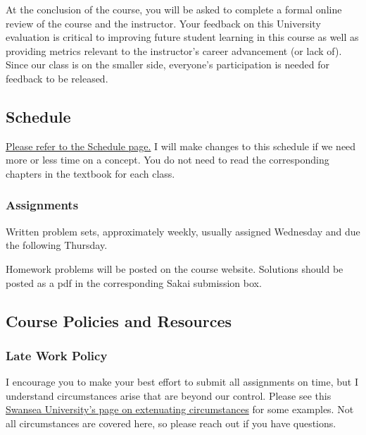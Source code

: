 \documentclass[
  letterpaper,
  DIV=11,
  numbers=noendperiod]{scrartcl}
\begin{document}
At the conclusion of the course, you will be asked to complete a formal
online review of the course and the instructor. Your feedback on this
University evaluation is critical to improving future student learning
in this course as well as providing metrics relevant to the instructor's
career advancement (or lack of). Since our class is on the smaller side,
everyone's participation is needed for feedback to be released.

\subsection{Schedule}\label{schedule}

\href{./schedule.qmd}{Please refer to the Schedule page.} I will make
changes to this schedule if we need more or less time on a concept. You
do not need to read the corresponding chapters in the textbook for each
class.

\subsubsection{Assignments}\label{assignments}

Written problem sets, approximately weekly, usually assigned Wednesday
and due the following Thursday.

Homework problems will be posted on the course website. Solutions should
be posted as a pdf in the corresponding Sakai submission box.

\subsection{Course Policies and
Resources}\label{course-policies-and-resources}

\subsubsection{Late Work Policy}\label{late-work-policy}

I encourage you to make your best effort to submit all assignments on
time, but I understand circumstances arise that are beyond our control.
Please see this
\href{https://myuni.swansea.ac.uk/academic-life/extenuating-circumstances/\#how-can-the-university-support-me-and-what-should-i-do=is-expanded&what-are-extenuating-circumstances=is-expanded&what-isnt-an-extenuating-circumstance=is-expanded&what-supporting-evidence-is-required=is-expanded&who-should-i-contact-to-make-an-extenuating-circumstances-application=is-expanded&who-will-make-a-decision-on-my-application=is-expanded}{Swansea
University's page on extenuating circumstances} for some examples. Not
all circumstances are covered here, so please reach out if you have
questions.~
\end{document}
